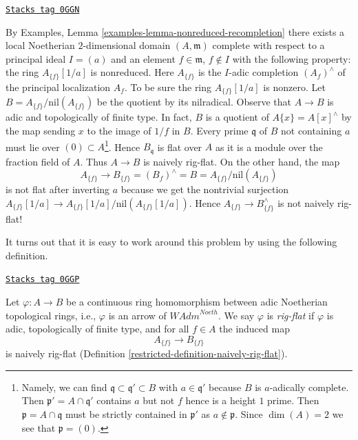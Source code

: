 \begin{example}
\label{restricted-example-recompletion-not-rig-flat}
\href{https://stacks.math.columbia.edu/tag/0GGN}{\texttt{Stacks tag 0GGN}}

By Examples, Lemma \ref{examples-lemma-nonreduced-recompletion}
there exists a local Noetherian $2$-dimensional domain $(A, \mathfrak m)$
complete with respect to a principal ideal $I = (a)$ and an
element $f \in \mathfrak m$, $f \not \in I$ with the following
property: the ring $A_{\{f\}}[1/a]$ is nonreduced.
Here $A_{\{f\}}$ is the $I$-adic completion $(A_f)^\wedge$ of the principal
localization $A_f$. To be sure the ring $A_{\{f\}}[1/a]$ is nonzero.
Let $B = A_{\{f\}}/ \text{nil}(A_{\{f\}})$ be the quotient
by its nilradical. Observe that $A \to B$ is adic and
topologically of finite type.
In fact, $B$ is a quotient of $A\{x\} = A[x]^\wedge$ by the
map sending $x$ to the image of $1/f$ in $B$.
Every prime $\mathfrak q$ of $B$ not containing $a$ must
lie over $(0) \subset A$\footnote{Namely, we can find
$\mathfrak q \subset \mathfrak q' \subset B$ with $a \in \mathfrak q'$
because $B$ is $a$-adically complete. Then $\mathfrak p' = A \cap \mathfrak q'$
contains $a$ but not $f$ hence is a height $1$ prime. Then
$\mathfrak p = A \cap \mathfrak q$ must be strictly
contained in $\mathfrak p'$ as $a \not \in \mathfrak p$. Since
$\dim(A) = 2$ we see that $\mathfrak p = (0)$.}. Hence $B_\mathfrak q$
is flat over $A$ as it is a module over the
fraction field of $A$. Thus $A \to B$ is naively rig-flat.
On the other hand, the map
$$
A_{\{f\}}
\longrightarrow
B_{\{f\}} = (B_f)^\wedge = B = A_{\{f\}} /\text{nil}(A_{\{f\}})
$$
is not flat after inverting $a$ because we get the nontrivial surjection
$A_{\{f\}}[1/a] \to A_{\{f\}}[1/a]/\text{nil}(A_{\{f\}}[1/a])$.
Hence $A_{\{f\}} \to B_{\{f\}}^\wedge$ is not naively rig-flat!
\end{example}

It turns out that it is easy to work around this problem by
using the following definition.

\begin{definition}
\label{restricted-definition-rig-flat-continuous-homomorphism}
\href{https://stacks.math.columbia.edu/tag/0GGP}{\texttt{Stacks tag 0GGP}}

Let $\varphi : A \to B$ be a continuous ring homomorphism between
adic Noetherian topological rings, i.e., $\varphi$ is an arrow of
$\textit{WAdm}^{Noeth}$. We say $\varphi$ is {\it rig-flat} if $\varphi$
is adic, topologically of finite type, and for all $f \in A$ the induced map
$$
A_{\{f\}} \longrightarrow B_{\{f\}}
$$
is naively rig-flat (Definition \ref{restricted-definition-naively-rig-flat}).
\end{definition}

